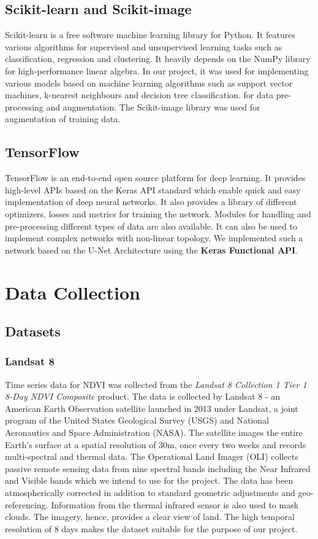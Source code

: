 \documentclass[12pt, a4paper]{report}
\begin{document}
\subsection{Scikit-learn and Scikit-image}
Scikit-learn is a free software machine learning library for Python. It features various algorithms for supervised and unsupervised learning tasks such as classification, regression and clustering. It heavily depends on the NumPy library for high-performance linear algebra. In our project, it was used for implementing various models based on machine learning algorithms such as support vector machines, k-nearest neighbours and decision tree classification.  for data pre-processing and augmentation. The Scikit-image library was used for augmentation of training data.\cite{scikit}
\subsection{TensorFlow}
TensorFlow is an end-to-end open source platform for deep learning. It provides high-level APIs based on the Keras API standard which enable quick and easy implementation of deep neural networks. It also provides a library of different optimizers, losses and metrics for training the network. Modules for handling and pre-processing different types of data are also available. It can also be used to implement complex networks with non-linear topology. We implemented such a network based on the U-Net Architecture using the \textbf{Keras Functional API}.\cite{tensorflow}
\section{Data Collection}
\subsection{Datasets}
\subsubsection{Landsat 8}
Time series data for NDVI was collected from the \textit{Landsat 8 Collection 1 Tier 1 8-Day NDVI Composite} product. The data is collected by Landsat 8 - an American Earth Observation satellite launched in 2013 under Landsat, a joint program of the United States Geological Survey (USGS) and National Aeronautics and Space Administration (NASA). The satellite images the entire Earth's surface at a spatial resolution of 30m, once every two weeks and records multi-spectral and thermal data. The Operational Land Imager (OLI) collects passive remote sensing data from nine spectral bands including the Near Infrared and Visible bands which we intend to use for the project. The data has been atmospherically corrected in addition to standard geometric adjustments and geo-referencing. Information from the thermal infrared sensor is also used to mask clouds. The imagery, hence, provides a clear view of land. The high temporal resolution of 8 days makes the dataset suitable for the purpose of our project.\cite{geel8, l8}
\end{document}
